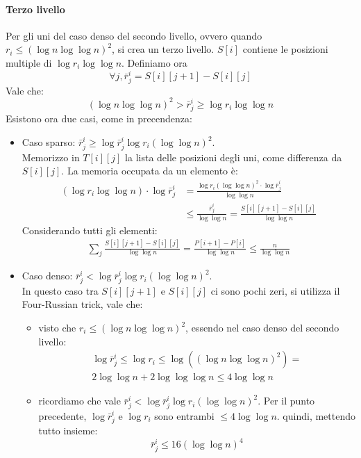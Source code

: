 \paragraph{Terzo livello}
Per gli uni del caso denso del secondo livello, ovvero quando 
$r_i \leq (\log n\log \log n )^2$, si crea un terzo livello.
$S[i]$ contiene le posizioni multiple di $\log r_i \log \log n$.
Definiamo ora
$$\forall j, \bar{r}_j^i = S[i][j+1] - S[i][j]$$
Vale che:
$$ (\log n \log \log n)^2 > \bar{r}_j^i \geq \log r_i \log \log n$$
Esistono ora due casi, come in precendenza:
\begin{itemize}
    \item Caso sparso: $\bar{r}_j^i \geq \log \bar{r}_j^i \log r_i (\log \log n)^2$.\\
    Memorizzo in $T[i][j]$ la lista delle posizioni degli uni, come differenza da $S[i][j]$.
    La memoria occupata da un elemento è:
    \begin{equation}
        \begin{aligned}
            (\log r_i \log \log n)\cdot \log \bar{r}_j^i &= 
            \frac{\log r_i (\log \log n)^2\cdot \log \bar{r}_j^i}{\log\log n} 
            \\&\leq \frac{\bar{r}_j^i}{\log \log n}
            = \frac{S[i][j+1] - S[i][j]}{\log \log n}
        \end{aligned}
    \end{equation}
    Considerando tutti gli elementi:
    \begin{equation}
        \begin{aligned}
            \sum_j \frac{S[i][j+1] - S[i][j]}{\log \log n} = 
            \frac{P[i+1] - P[i]}{\log \log n} \leq \frac{n}{\log \log n}
        \end{aligned}
    \end{equation}
    \item Caso denso: $\bar{r}_j^i < \log \bar{r}_j^i \log r_i (\log \log n)^2$.\\
    In questo caso tra $S[i][j+1]$ e $S[i][j]$ ci sono pochi zeri, si utilizza il 
    Four-Russian trick, vale che:
    \begin{itemize}
        \item visto che $r_i \leq (\log n \log \log n)^2$, essendo nel 
        caso denso del secondo livello:
        \begin{equation}
            \begin{aligned}
                \log \bar{r}_j^i \leq \log r_i \leq \log((\log n \log \log n)^2) = \\
                2 \log \log n + 2 \log \log \log n \leq 4\log\log n        
            \end{aligned}
        \end{equation}
        \item ricordiamo che vale $\bar{r}_j^i < \log \bar{r}_j^i \log r_i (\log \log n)^2$.
        Per il punto precedente, $\log \bar{r}_j^i$ e $\log r_i$ sono entrambi $\leq 4\log\log n$.
        quindi, mettendo tutto insieme:
        $$\bar{r}_j^i \leq 16(\log \log n)^4$$
    \end{itemize}
\end{itemize}
